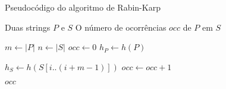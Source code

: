 \begin{frame}[fragile]{Pseudocódigo do algoritmo de Rabin-Karp}

    \begin{algorithm}[H]
        \caption{Algoritmo de Rabin-Karp -- Naive}
        \begin{algorithmic}[1]
            \Require Duas strings $P$ e $S$
            \Ensure O número de ocorrências $occ$ de $P$ em $S$

                \State $m \gets |P|$
                \State $n \gets |S|$
                \State $occ \gets 0$
                \State $h_P \gets h(P)$

                    \State $h_S \gets h(S[i..(i + m - 1)])$
                            \State $occ \gets occ + 1$
                        \EndIf
                    \EndIf
                \EndFor

                \State \Return $occ$
            \EndFunction
        \end{algorithmic}
    \end{algorithm}

\end{frame}

